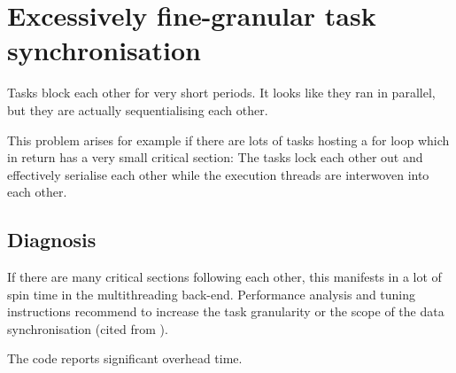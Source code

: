 \section{Excessively fine-granular task synchronisation}
\label{section:node-level:fine-granular-task-synchronisation}

\begin{hypothesis}
 Tasks block each other for very short periods. It looks like they ran in parallel, but they are actually sequentialising each other.
\end{hypothesis}


This problem arises for example if there are lots of tasks hosting a for loop 
which in return has a very small critical section:
The tasks lock each other out and effectively serialise each other while the 
execution threads are interwoven into each other.


\subsection{Diagnosis}


If there are many critical sections following each other, this manifests in a 
lot of spin time in the multithreading back-end.
Performance analysis and tuning instructions recommend to increase the task 
granularity or the scope of the data synchronisation (cited from \vtune).

\begin{instructions}{\vtune}
 The code reports significant overhead time.
\end{instructions}

